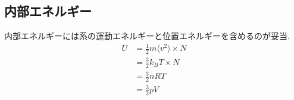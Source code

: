 \documentclass[dvipdfmx,uplatex]{jsarticle}
\begin{document}
\subsection{内部エネルギー}
内部エネルギーには系の運動エネルギーと位置エネルギーを含めるのが妥当.
\begin{align*}
U &= \frac{1}{2}m \langle v^2 \rangle \times N \\
&= \frac{3}{2}k_BT \times N \\
&= \frac{3}{2}nRT \\
&= \frac{3}{2}pV
\end{align*}
\end{document}
